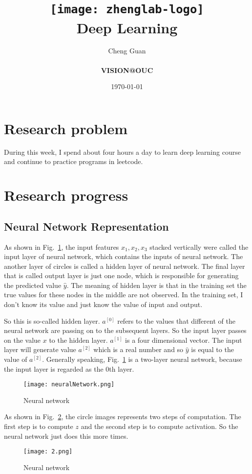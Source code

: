 \documentclass[a4paper]{article}
\title{
    \vspace*{1in}
    \texttt{[image: zhenglab-logo]} \\
    \vspace*{1.2in}
    \textbf{\huge Deep Learning}
    \vspace{0.2in}
}
\author{Cheng Guan \\
    \vspace*{0.5in} \\
    \textbf{VISION@OUC}\\
    \vspace*{1in}
}
\date{\today}
\begin{document}
\maketitle
\setcounter{page}{0}
\thispagestyle{empty}
\newpage
\section{Research problem}
During this week, I spend about four hours a day to learn deep learning course \cite{dp07} and continue to practice programs in leetcode.
\section{Research progress}
\subsection{Neural Network Representation}
As shown in Fig.~\ref{fig1}, the input features $x_1, x_2, x_3$ stacked vertically were called the input layer of neural network, which contains the inputs of neural network. The another layer of circles is called a hidden layer of neural network. The final layer that is called output layer is just one node, which is responsible for generating the predicted value $\hat{y}$. The meaning of hidden layer is that in the training set the true values for these nodes in the middle are not observed. In the training set, I don't know its value and just know the value of input and output. 
\par
So this is so-called hidden layer. $a^{\left[0\right]}$ refers to the values that different of the neural network are passing on to the subsequent layers. So the input layer passes on the value $x$ to the hidden layer. $a^{\left[1\right]}$ is a four dimensional vector. The input layer will generate value $a^{\left[2\right]}$ which is a real number and so $\hat{y}$ is equal to the value of $a^{\left[2\right]}$. Generally speaking, Fig.~\ref{fig1} is a two-layer neural network, because the input layer is regarded as the $0$th layer. 
%
\begin{figure}[ht]
	\centering
	\texttt{[image: neuralNetwork.png]}
	\caption{Neural network}
	\label{fig1}
\end{figure}
%
As shown in Fig.~\ref{fig2}, the circle images represents two steps of computation. The first step is to compute $z$ and the second step is to compute activation. So the neural network just does this more times.
%
\begin{figure}[h]
	\centering
	\texttt{[image: 2.png]}
	\caption{Neural network}
	\label{fig2}
\end{figure}
\end{document}
